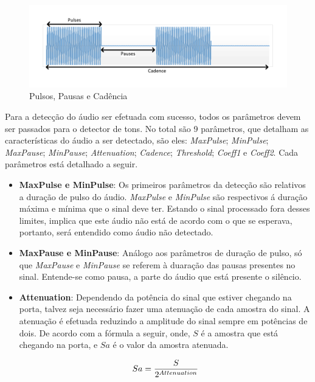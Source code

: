 \documentclass[monografia]{subfiles}
\begin{document}
		\begin{figure}[!h]
		\centering 
		\includegraphics[scale=0.8]{img/audios/toneParameters.pdf}
		\caption{Pulsos, Pausas e Cadência}
		\label{fig:audioToneParameters}
		\end{figure}

	Para a detecção do áudio ser efetuada com sucesso, todos os parâmetros devem ser passados para o detector de tons. No total são 9 parâmetros,
	que detalham as características do áudio a ser detectado, são eles: \textit{MaxPulse}; \textit{MinPulse}; \textit{MaxPause}; 
	\textit{MinPause}; \textit{Attenuation}; \textit{Cadence}; \textit{Threshold}; \textit{Coeff1} e \textit{Coeff2}. Cada parâmetros está detalhado 
	a seguir.

	\begin{itemize}
	\item \textbf{MaxPulse e MinPulse}: Os primeiros parâmetros da detecção são relativos a duração de pulso do áudio. \textit{MaxPulse} e 
	\textit{MinPulse} são respectivos á duração máxima e mínima que o sinal deve ter. Estando o sinal processado fora desses limites, 
	implica que este áudio não está de acordo com o que se esperava, portanto, será entendido como áudio não detectado.
	\end{itemize}
	
	\begin{itemize}
	\item \textbf{MaxPause e MinPause}: Análogo aos parâmetros de duração de pulso, só que \textit{MaxPause} e \textit{MinPause} se referem à duaração das 
	pausas presentes no sinal. Entende-se como pausa, a parte do áudio que está presente o silêncio.
	\end{itemize}

	\begin{itemize}
	\item \textbf{Attenuation}:
		Dependendo da potência do sinal que estiver chegando na porta, talvez seja necessário fazer uma atenuação de cada amostra do sinal. A atenuação é 
		efetuada reduzindo a amplitude do sinal sempre em potências de dois. De acordo com a fórmula a seguir, onde, $S$ é a amostra que está chegando na 
		porta, e $S{a}$ é o valor da amostra atenuada.

			\begin{equation}
			S{a} = {S \over 2^{Attenuation}}
			\label{eq:SignalAttenuation}
			\end{equation}
	\end{itemize}
\end{document}
